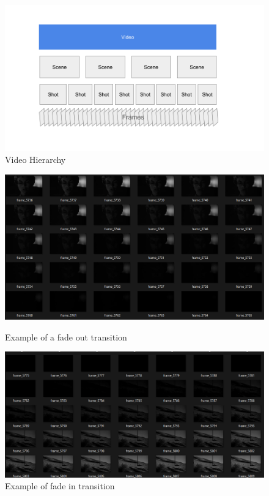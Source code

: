 \documentclass[12pt]{report}
\begin{document}
	\begin{figure}[h]  %
		\centering
		\includegraphics[width=\linewidth]{video_decomposition.png}  %
		\caption{Video Hierarchy \cite{sbd}}
		\label{fig:video_decomposition}
	\end{figure}
	
	
	\begin{figure}[h]
		\centering
		\begin{minipage}{0.45\linewidth}
			\centering
			\includegraphics[width=\linewidth]{example_fade_out_transition.png}
			\caption{Example of a fade out transition}
			\label{fig:fade_out}
		\end{minipage}
		\hspace{0.05\linewidth}  %
		\begin{minipage}{0.45\linewidth}
			\centering
			\includegraphics[width=\linewidth]{example_fade_in_transition.png}
			\caption{Example of fade in transition}
			\label{fig:fade_in}
		\end{minipage}
	\end{figure}
	
\end{document}
